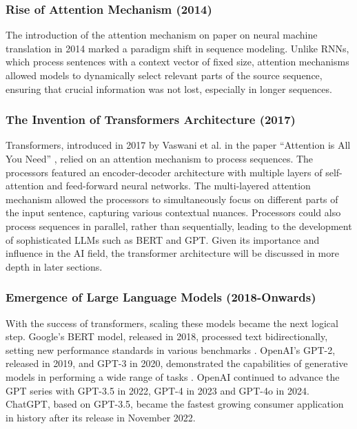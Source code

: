 \subsubsection{Rise of Attention Mechanism (2014)}

The introduction of the attention mechanism on paper on neural machine translation \cite{bahdanau2014neural} in 2014 marked a paradigm shift in sequence modeling. Unlike RNNs, which process sentences with a context vector of fixed size, attention mechanisms allowed models to dynamically select relevant parts of the source sequence, ensuring that crucial information was not lost, especially in longer sequences.

\subsubsection{The Invention of Transformers Architecture (2017)}

Transformers, introduced in 2017 by Vaswani et al. in the paper “Attention is All You Need” \cite{vaswani2017attention}, relied on an attention mechanism to process sequences. The processors featured an encoder-decoder architecture with multiple layers of self-attention and feed-forward neural networks. The multi-layered attention mechanism allowed the processors to simultaneously focus on different parts of the input sentence, capturing various contextual nuances. Processors could also process sequences in parallel, rather than sequentially, leading to the development of sophisticated LLMs such as BERT and GPT. Given its importance and influence in the AI field, the transformer architecture will be discussed in more depth in later sections.

\subsubsection{Emergence of Large Language Models (2018-Onwards)}

With the success of transformers, scaling these models became the next logical step. Google's BERT model, released in 2018, processed text bidirectionally, setting new performance standards in various benchmarks \cite{devlin2018bert}. OpenAI's GPT-2, released in 2019, and GPT-3 in 2020, demonstrated the capabilities of generative models in performing a wide range of tasks \cite{radford2019language}. OpenAI continued to advance the GPT series with GPT-3.5 in 2022, GPT-4 in 2023 and GPT-4o in 2024. ChatGPT, based on GPT-3.5, became the fastest growing consumer application in history after its release in November 2022.

